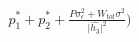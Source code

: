 \documentclass[preview]{standalone}
\begin{document}
\begin{align*}
p_1^\ast + p_2^\ast + \frac{P \sigma_\epsilon^2 + W_{tot} \sigma^2}{\big|\hat{h_3}\big|^2}\big)
\end{align*}
\end{document}
